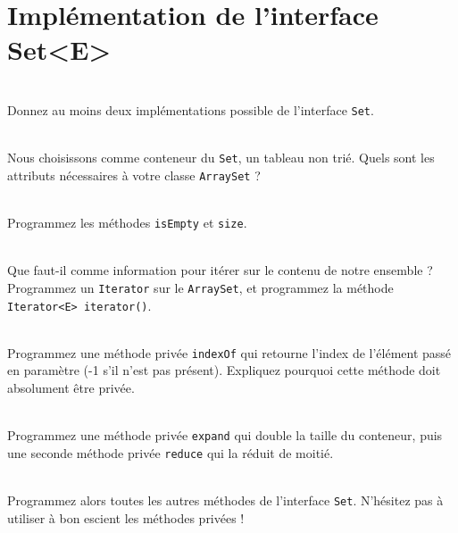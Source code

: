 \documentclass[iutinfo,a4paper,nocorrections,10pt]{ustl-tdtp}
\begin{document}
\section{Implémentation de l'interface Set<E>}

~\\ \question Donnez au moins deux implémentations possible de l'interface \texttt{Set}.

~\\ \question Nous choisissons comme conteneur du \texttt{Set}, un tableau non trié. 
Quels sont les attributs nécessaires à votre classe \texttt{ArraySet} ?

~\\ \question Programmez les méthodes \texttt{isEmpty} et \texttt{size}.

~\\ \question Que faut-il comme information pour itérer sur le contenu de notre ensemble ? Programmez un \texttt{Iterator} sur le \texttt{ArraySet}, et programmez la méthode \texttt{Iterator<E> iterator()}.

~\\ \question Programmez une méthode privée \texttt{indexOf} qui retourne l'index de l'élément passé en paramètre (-1 s'il n'est pas présent). Expliquez pourquoi cette méthode doit absolument être privée.

~\\ \question Programmez une méthode privée \texttt{expand} qui double la taille du conteneur, puis une seconde méthode privée \texttt{reduce} qui la réduit de moitié.

~\\ \question Programmez alors toutes les autres méthodes de l'interface \texttt{Set}. N'hésitez pas à utiliser à bon escient les méthodes privées !
\end{document}
